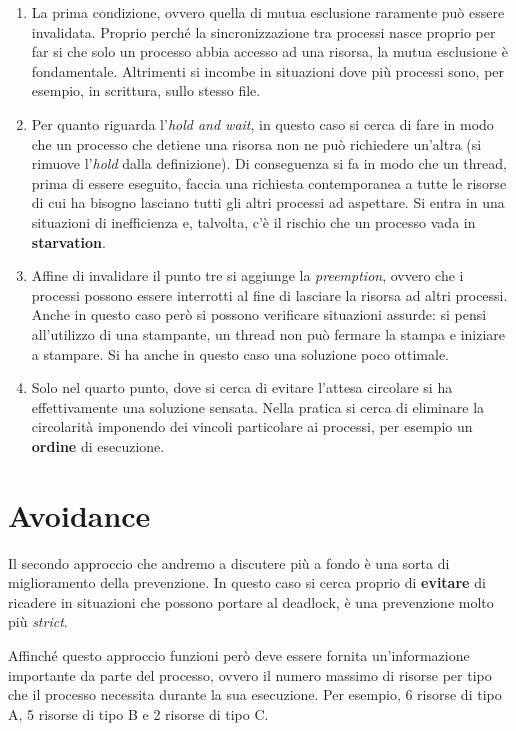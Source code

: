 \begin{enumerate}
    \item La prima condizione, ovvero quella di mutua esclusione raramente può essere invalidata. Proprio perché la sincronizzazione tra processi nasce proprio per far si che solo un processo abbia accesso ad una risorsa, la mutua esclusione è fondamentale. Altrimenti si incombe in situazioni dove più processi sono, per esempio, in scrittura, sullo stesso file.
    
    \item Per quanto riguarda l'\textit{hold and wait}, in questo caso si cerca di fare in modo che un processo che detiene una risorsa non ne può richiedere un'altra (si rimuove l'\textit{hold} dalla definizione). Di conseguenza si fa in modo che un thread, prima di essere eseguito, faccia una richiesta contemporanea a tutte le risorse di cui ha bisogno lasciano tutti gli altri processi ad aspettare. Si entra in una situazioni di inefficienza e, talvolta, c'è il rischio che un processo vada in \textbf{starvation}.

    \item Affine di invalidare il punto tre si aggiunge la \textit{preemption}, ovvero che i processi possono essere interrotti al fine di lasciare la risorsa ad altri processi. Anche in questo caso però si possono verificare situazioni assurde: si pensi all'utilizzo di una stampante, un thread non può fermare la stampa e iniziare a stampare. Si ha anche in questo caso una soluzione poco ottimale.

    \item Solo nel quarto punto, dove si cerca di evitare l'attesa circolare si ha effettivamente una soluzione sensata. Nella pratica si cerca di eliminare la circolarità imponendo dei vincoli particolare ai processi, per esempio un \textbf{ordine} di esecuzione. 
\end{enumerate}

% 
\section{Avoidance}\label{avoidance}
Il secondo approccio che andremo a discutere più a fondo è una sorta di miglioramento della prevenzione. In questo caso si cerca proprio di \textbf{evitare} di ricadere in situazioni che possono portare al deadlock, è una prevenzione molto più \textit{strict}.

Affinché questo approccio funzioni però deve essere fornita un'informazione importante da parte del processo, ovvero il numero massimo di risorse per tipo che il processo necessita durante la sua esecuzione. Per esempio, 6 risorse di tipo A, 5 risorse di tipo B e 2 risorse di tipo C.

